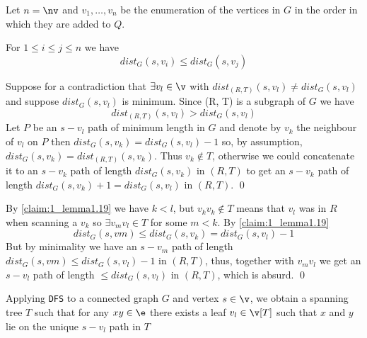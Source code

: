 \begin{prf}
    Let $n = \nv$ and $v_1, \dots, v_n$ be the enumeration of the vertices in $G$ in the order in which they are added to $Q$.
    \begin{claim}
        \label{claim:1_lemma1.19}
        For $1 \leq i \leq j \leq n$ we have
        \begin{equation*}
            dist_G(s, v_i) \leq dist_G(s, v_j)
        \end{equation*}
    \end{claim}
    \begin{prf}
        Suppose for a contradiction that $\exists v_l \in \v$ with $dist_{(R, T)}(s, v_l) \neq dist_G(s, v_l)$ and suppose $dist_G(s, v_l)$ is minimum. Since (R, T) is a subgraph of $G$ we have
        \begin{equation*}
            dist_{(R, T)}(s, v_l) > dist_G(s, v_l)
        \end{equation*}
        Let $P$ be an $s - v_l$ path of minimum length in $G$ and denote by $v_k$ the neighbour of $v_l$ on $P$ then $dist_G(s, v_k) = dist_G(s, v_l) - 1$ so, by assumption, $dist_G(s, v_k) = dist_{(R, T)}(s, v_k)$.
        Thus $v_k \notin T$, otherwise we could concatenate it to an $s - v_k$ path of length $dist_G(s, v_k)$ in $(R, T)$ to get an $s - v_k$ path of length $dist_G(s, v_k) + 1 = dist_G(s, v_l)$ in $(R, T)$. \qed
    \end{prf}
    By \ref{claim:1_lemma1.19} we have $k < l$, but $v_kv_k \notin T$ means that $v_l$ was in $R$ when scanning a $v_k$ so $\exists v_mv_l \in T$ for some $m < k$. By \ref{claim:1_lemma1.19}
    \begin{equation*}
        dist_G(s, vm) \leq dist_G(s, v_k) = dist_G(s, v_l) - 1
    \end{equation*}
    But by minimality we have an $s - v_m$ path of length $dist_G(s, vm) \leq dist_G(s, v_l) - 1$ in $(R, T)$, thus, together with $v_mv_l$ we get an $s - v_l$ path of length $\leq dist_G(s, v_l)$ in $(R, T)$, which is absurd. \qed
\end{prf}
\begin{customlemma}{1.20}
    \label{lemma:1.20}
    Applying \texttt{DFS} to a connected graph $G$ and vertex $s \in \v$, we obtain a spanning tree $T$ such that for any $xy \in \e$ there exists a leaf $v_l \in \v[T]$ such that $x$ and $y$ lie on the unique $s - v_l$ path in $T$
\end{customlemma}
